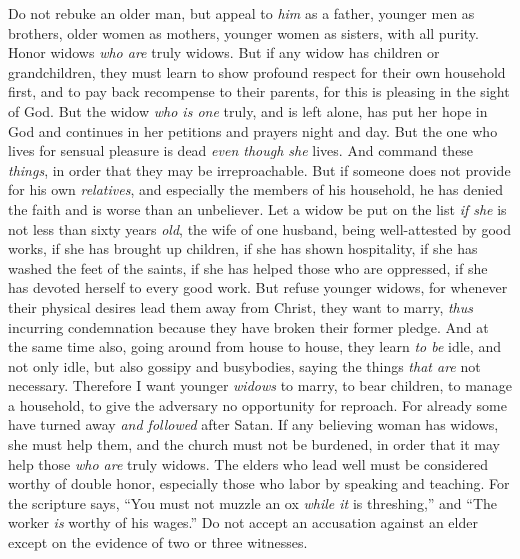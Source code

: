 \begin{biblechapter} %
 Do not rebuke an older man, but appeal to \textit{him} as a father, younger men as brothers,
\verse older women as mothers, younger women as sisters, with all purity.
\verse Honor widows \textit{who are} truly widows.
\verse But if any widow has children or grandchildren, they must learn to show profound respect for their own household first, and to pay back recompense to their parents, for this is pleasing in the sight of God.
\verse But the widow \textit{who is one} truly, and is left alone, has put her hope in God and continues in her petitions and prayers night and day.
\verse But the one who lives for sensual pleasure is dead \textit{even though she} lives.
\verse And command these \textit{things}, in order that they may be irreproachable.
\verse But if someone does not provide for his own \textit{relatives}, and especially the members of his household, he has denied the faith and is worse than an unbeliever.
\verse Let a widow be put on the list \textit{if she} is not less than sixty years \textit{old}, the wife of one husband,
\verse being well-attested by good works, if she has brought up children, if she has shown hospitality, if she has washed the feet of the saints, if she has helped those who are oppressed, if she has devoted herself to every good work.
\verse But refuse younger widows, for whenever their physical desires lead them away from Christ, they want to marry,
\verse \textit{thus} incurring condemnation because they have broken their former pledge.
\verse And at the same time also, going around from house to house, they learn \textit{to be} idle, and not only idle, but also gossipy and busybodies, saying the things \textit{that are} not necessary.
\verse Therefore I want younger \textit{widows} to marry, to bear children, to manage a household, to give the adversary no opportunity for reproach.
\verse For already some have turned away \textit{and followed} after Satan.
\verse If any believing woman has widows, she must help them, and the church must not be burdened, in order that it may help those \textit{who are} truly widows.
 The elders who lead well must be considered worthy of double honor, especially those who labor by speaking and teaching.
\verse For the scripture says, “You must not muzzle an ox \textit{while it} is threshing,” and “The worker \textit{is} worthy of his wages.”
\verse Do not accept an accusation against an elder except on the evidence of two or three witnesses.

\end{biblechapter}
